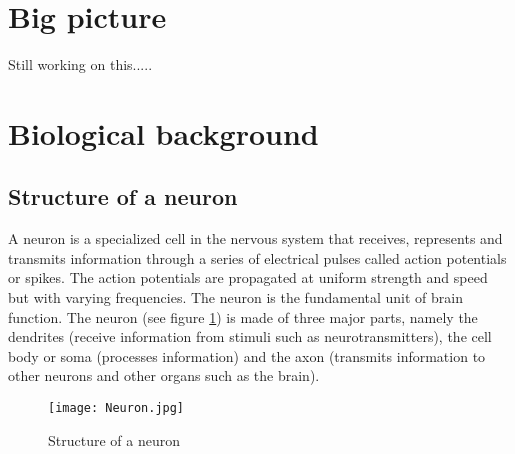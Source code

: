 \section{Big picture}

Still working on this.....




\section{Biological background}
\subsection{Structure of a neuron}
A neuron is a specialized cell in the nervous system that receives, represents and transmits information through a series of electrical pulses called action potentials or spikes. The action potentials are propagated at uniform strength and speed but with varying frequencies. The neuron is the fundamental unit of brain function. The neuron (see  figure \ref{fig:Neuron}) is made of three major parts, namely the dendrites (receive information from stimuli such as neurotransmitters), the cell body or soma (processes information) and the axon (transmits information to other neurons and other organs such as the brain).

\begin{figure}[h]
\caption{Structure of  a neuron}
\texttt{[image: Neuron.jpg]}
      \label{fig:Neuron}
\end{figure}


